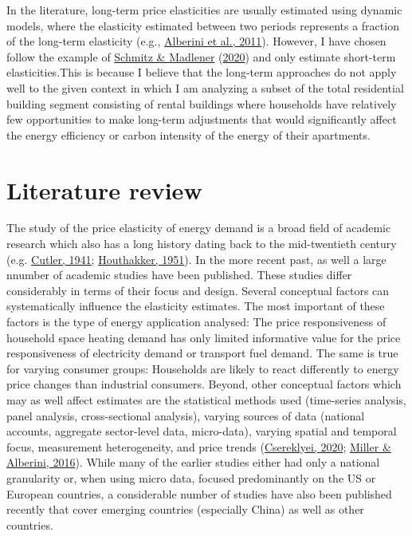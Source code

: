 \documentclass[12pt,twoside]{reedthesis}
\begin{document}
In the literature, long-term price elasticities are usually estimated using dynamic models, where the elasticity estimated between two periods represents a fraction of the long-term elasticity (e.g., \protect\hyperlink{ref-alberini_etal11}{Alberini et al., 2011}). However, I have chosen follow the example of \protect\hyperlink{ref-schmitz_madlener20}{Schmitz \& Madlener} (\protect\hyperlink{ref-schmitz_madlener20}{2020}) and only estimate short-term elasticities.This is because I believe that the long-term approaches do not apply well to the given context in which I am analyzing a subset of the total residential building segment consisting of rental buildings where households have relatively few opportunities to make long-term adjustments that would significantly affect the energy efficiency or carbon intensity of the energy of their apartments.

\hypertarget{review}{%
\section{Literature review}\label{review}}

The study of the price elasticity of energy demand is a broad field of academic research which also has a long history dating back to the mid-twentieth century (e.g. \protect\hyperlink{ref-cutler41}{Cutler, 1941}; \protect\hyperlink{ref-houthakker51}{Houthakker, 1951}). In the more recent past, as well a large nnumber of academic studies have been published. These studies differ considerably in terms of their focus and design. Several conceptual factors can systematically influence the elasticity estimates. The most important of these factors is the type of energy application analysed: The price responsiveness of household space heating demand has only limited informative value for the price responsiveness of electricity demand or transport fuel demand. The same is true for varying consumer groups: Households are likely to react differently to energy price changes than industrial consumers. Beyond, other conceptual factors which may as well affect estimates are the statistical methods used (time-series analysis, panel analysis, cross-sectional analysis), varying sources of data (national accounts, aggregate sector-level data, micro-data), varying spatial and temporal focus, measurement heterogeneity, and price trends (\protect\hyperlink{ref-csereklyei20}{Csereklyei, 2020}; \protect\hyperlink{ref-miller_alberini16}{Miller \& Alberini, 2016}). While many of the earlier studies either had only a national granularity or, when using micro data, focused predominantly on the US or European countries, a considerable number of studies have also been published recently that cover emerging countries (especially China) as well as other countries.
\end{document}
